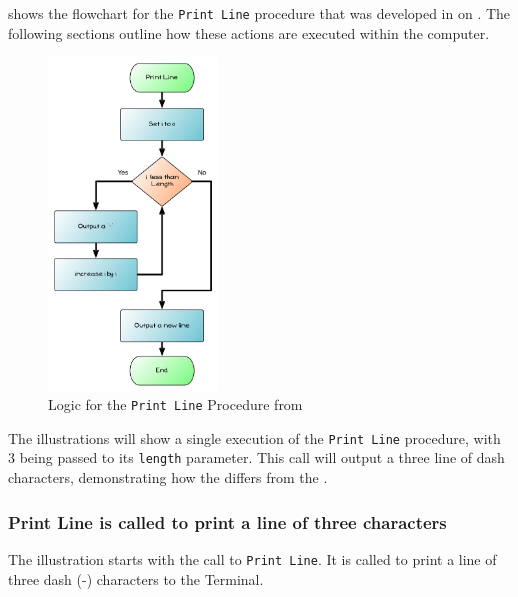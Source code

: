  shows the flowchart for the \texttt{Print Line} procedure that was developed in  on . The following sections outline how these actions are executed within the computer.

\begin{figure}[htbp]
   \centering
   \includegraphics[width=0.4\textwidth]{./topics/control-flow/diagrams/PrintLine} 
   \caption{Logic for the \texttt{Print Line} Procedure from }
   \label{fig:print-line-understanding}
\end{figure}

The illustrations will show a single execution of the \texttt{Print Line} procedure, with 3 being passed to its \texttt{length} parameter. This call will output a three line of dash characters, demonstrating how the  differs from the .

\clearpage
\subsubsection{Print Line is called to print a line of three characters} %
\label{ssub:print_line_is_called_to_print_a_line_of_three_characters}

The illustration starts with the call to \texttt{Print Line}. It is called to print a line of three dash (-) characters to the Terminal.

